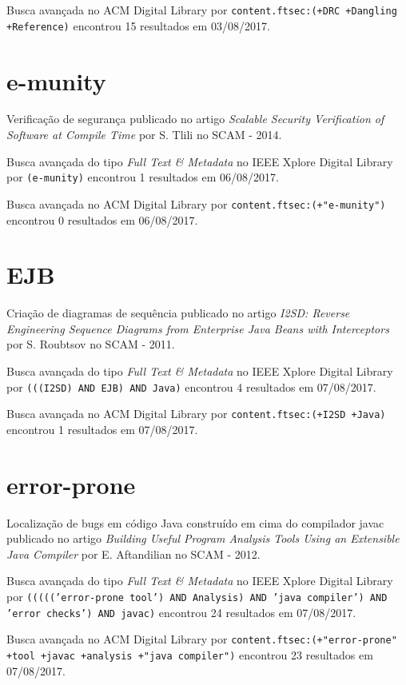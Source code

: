 Busca avançada no ACM Digital Library por
\texttt{content.ftsec:(+DRC +Dangling +Reference)}
encontrou
15 resultados em
03/08/2017.

\section{e-munity}

Verificação de segurança
publicado no artigo
{\it Scalable Security Verification of Software at Compile Time}
por
S. Tlili
no
SCAM
-
2014.

Busca avançada do tipo {\it Full Text \& Metadata} no IEEE Xplore Digital Library por
\texttt{(e-munity)}
encontrou
1 resultados em
06/08/2017.

Busca avançada no ACM Digital Library por
\texttt{content.ftsec:(+"e-munity")}
encontrou
0 resultados em
06/08/2017.

\section{EJB}

Criação de diagramas de sequência
publicado no artigo
{\it I2SD: Reverse Engineering Sequence Diagrams from Enterprise Java Beans with Interceptors}
por
S. Roubtsov
no
SCAM
-
2011.

Busca avançada do tipo {\it Full Text \& Metadata} no IEEE Xplore Digital Library por
\texttt{(((I2SD) AND EJB) AND Java)}
encontrou
4 resultados em
07/08/2017.

Busca avançada no ACM Digital Library por
\texttt{content.ftsec:(+I2SD +Java)}
encontrou
1 resultados em
07/08/2017.

\section{error-prone}

Localização de bugs em código Java construído em cima do compilador javac
publicado no artigo
{\it Building Useful Program Analysis Tools Using an Extensible Java Compiler}
por
E. Aftandilian
no
SCAM
-
2012.

Busca avançada do tipo {\it Full Text \& Metadata} no IEEE Xplore Digital Library por
\texttt{((((('error-prone tool') AND Analysis) AND 'java compiler') AND 'error checks') AND javac)}
encontrou
24 resultados em
07/08/2017.

Busca avançada no ACM Digital Library por
\texttt{content.ftsec:(+"error-prone" +tool +javac +analysis +"java compiler")}
encontrou
23 resultados em
07/08/2017.

